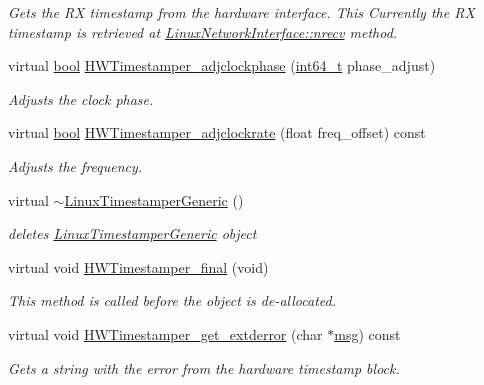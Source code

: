 \begin{DoxyCompactItemize}
\begin{DoxyCompactList}\small\item\em Gets the RX timestamp from the hardware interface. This Currently the RX timestamp is retrieved at \hyperlink{class_linux_network_interface_acb980fe584d47a71be88f12808edd91c}{Linux\+Network\+Interface\+::nrecv} method. \end{DoxyCompactList}\item 
virtual \hyperlink{avb__gptp_8h_af6a258d8f3ee5206d682d799316314b1}{bool} \hyperlink{class_linux_timestamper_generic_abf6eb9134a918a1e218402f7d9b15468}{H\+W\+Timestamper\+\_\+adjclockphase} (\hyperlink{parse_8c_a67a9885ef4908cb72ce26d75b694386c}{int64\+\_\+t} phase\+\_\+adjust)
\begin{DoxyCompactList}\small\item\em Adjusts the clock phase. \end{DoxyCompactList}\item 
virtual \hyperlink{avb__gptp_8h_af6a258d8f3ee5206d682d799316314b1}{bool} \hyperlink{class_linux_timestamper_generic_a40688d4900827bb422a3a172614878f8}{H\+W\+Timestamper\+\_\+adjclockrate} (float freq\+\_\+offset) const 
\begin{DoxyCompactList}\small\item\em Adjusts the frequency. \end{DoxyCompactList}\item 
virtual \hyperlink{class_linux_timestamper_generic_a1fd86742c8cd4f9ada339cd6987fde90}{$\sim$\+Linux\+Timestamper\+Generic} ()
\begin{DoxyCompactList}\small\item\em deletes \hyperlink{class_linux_timestamper_generic}{Linux\+Timestamper\+Generic} object \end{DoxyCompactList}\item 
virtual void \hyperlink{class_common_timestamper_a866fc2519a7b2a696e350ed05df53f90}{H\+W\+Timestamper\+\_\+final} (void)
\begin{DoxyCompactList}\small\item\em This method is called before the object is de-\/allocated. \end{DoxyCompactList}\item 
virtual void \hyperlink{class_common_timestamper_a3b26113436dec73775d2cbc523a6e074}{H\+W\+Timestamper\+\_\+get\+\_\+extderror} (char $\ast$\hyperlink{openavb__log_8c_a0c7e58a50354c4a4d6dad428d0e47029}{msg}) const 
\begin{DoxyCompactList}\small\item\em Gets a string with the error from the hardware timestamp block. \end{DoxyCompactList}\item 

\end{DoxyCompactItemize}
